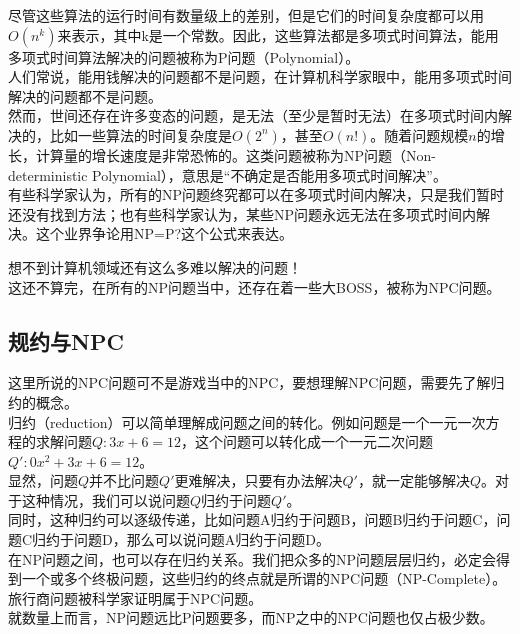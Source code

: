 尽管这些算法的运行时间有数量级上的差别，但是它们的时间复杂度都可以用$ O(n^k) $来表示，其中k是一个常数。因此，这些算法都是多项式时间算法，能用多项式时间算法解决的问题被称为P问题（Polynomial）。 \\

人们常说，能用钱解决的问题都不是问题，在计算机科学家眼中，能用多项式时间解决的问题都不是问题。 \\

然而，世间还存在许多变态的问题，是无法（至少是暂时无法）在多项式时间内解决的，比如一些算法的时间复杂度是$ O(2^n) $，甚至$ O(n!) $。随着问题规模$ n $的增长，计算量的增长速度是非常恐怖的。这类问题被称为NP问题（Non-deterministic Polynomial），意思是“不确定是否能用多项式时间解决”。 \\

有些科学家认为，所有的NP问题终究都可以在多项式时间内解决，只是我们暂时还没有找到方法；也有些科学家认为，某些NP问题永远无法在多项式时间内解决。这个业界争论用NP=P?这个公式来表达。

想不到计算机领域还有这么多难以解决的问题！ \\

这还不算完，在所有的NP问题当中，还存在着一些大BOSS，被称为NPC问题。

\subsection{规约与NPC}

这里所说的NPC问题可不是游戏当中的NPC，要想理解NPC问题，需要先了解归约的概念。 \\

归约（reduction）可以简单理解成问题之间的转化。例如问题是一个一元一次方程的求解问题$ Q: 3x + 6 = 12 $，这个问题可以转化成一个一元二次问题$ Q': 0x^2 + 3x + 6 = 12 $。 \\

显然，问题$ Q $并不比问题$ Q' $更难解决，只要有办法解决$ Q' $，就一定能够解决$ Q $。对于这种情况，我们可以说问题$ Q $归约于问题$ Q' $。 \\

同时，这种归约可以逐级传递，比如问题A归约于问题B，问题B归约于问题C，问题C归约于问题D，那么可以说问题A归约于问题D。 \\

在NP问题之间，也可以存在归约关系。我们把众多的NP问题层层归约，必定会得到一个或多个终极问题，这些归约的终点就是所谓的NPC问题（NP-Complete）。旅行商问题被科学家证明属于NPC问题。 \\

就数量上而言，NP问题远比P问题要多，而NP之中的NPC问题也仅占极少数。 \\


